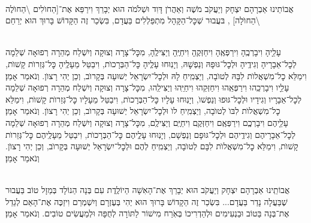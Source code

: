 \documentclass[twoside, openany, parskip=half, 11pt]{book}
\begin{document}
\begin{small}

\\
אֲבוֹתֵינוּ אַבְרָהָם יִצְחָק וְיַעֲקֹב מֹשֶׁה וְאַהֲרֹן דָּוִד וּשְׁלֹמֹה הוּא יְבָרֵךְ וִירַפֵּא אֶת־[הַחוׂלִים \textbackslash הַחוׂלֶה \textbackslash הַחוׂלָה]
,
בּעֲבוּר שְׁכׇּל־הַקָּהָל מִתְפַּלְלִים בַּעֲדָם, בִּשְׂכַר זֶה
הַקָּדוֹשׁ בָּרוּךְ הוּא יְרַחֵם
\setcolumnwidth{1.4in,1.4in,1.4in}
\begin{paracol}{3}
\\
עָלֵָיהָ וִיבָרְכֶֽהָ וִירַפְּאֶֽהָ וִיחַזְּקֶֽהָ וִיחַיֶּֽהָ וְיַצִּילֶֽהָ, מִכׇּל־צָרָה וְצוּקָה וְיִשְׁלַח מְהֵרָה רְפוּאָה שְׁלֵמָה לְכׇל־אֵבָרָיהָ וְגִידֶֽיהָ וּלְכׇל־גּוּפָהּ וְנַפְשׇׁהּ, וְיָנֽוּחוּ עָלְֶיהָ כׇּל־הַבְּרָכוׂת, וִיבַטֵּל מֵעָלֶֽיהָ כׇּל־גְּזֵרוׂת קָשׁוׂת, וִימַלֵּא כׇל־מִשְׁאֲלוׂת לִבָּהּ לְטוׂבָה, וְיַצְמִֽיחַ לָהּ וּלְכׇל־יִשְׂרָאֵל יְשׁוּעָה בְּקָרוׂב, וְכֵן יְהִי רָצוׂן. וְנֹאמַר אָמֵן׃
\switchcolumn
{}\\
עָלֵָיו וִיבָרְכֵֽהוּ וִירַפְּאֵֽהוּ וִיחַזְּקֵהוּ וִיחַיֵּֽהוּ וְיַצִּילֵֽהוּ, מִכׇּל־צָרָה וְצוּקָה וְיִשְׁלַח מְהֵרָה רְפוּאָה שְׁלֵמָה לְכׇל־אֵבָרָיו וְגִידָיו וּלְכׇל־גּוּפוּ וְנַפְשׁוׂ, וְיָנֽוּחוּ עָלָיו כׇּל־הַבְּרָכוׂת, וִיבַטֵּל מֵעָלָיו כׇּל־גְּזֵרוׂת קָשׁוׂת, וִימַלֵּא כׇל־מִשְׁאֲלוׂת לִבּוׂ לְטוׂבָה, וְיַצְמִֽיחַ לוׂ וּלְכׇל־יִשְׂרָאֵל יְשׁוּעָה בְּקָרוׂב, וְכֵן יְהִי רָצוׂן. וְנֹאמַר אָמֵן׃
\switchcolumn
{}\\
עָלֵָיהֶם וִיבָרְכְֶם וִירַפְּאֶֽם וִיחַזְּקֶֽם וִיחַיֶּֽם וְיַצִּילֶֽם, מִכׇּל־צָרָה וְצוּקָה וְיִשְׁלַח מְהֵרָה רְפוּאָה שְׁלֵמָה לְכׇל־אֵבָרָיהֶם וְגִידֶֽיהֶם וּלְכׇל־גּוּפָם וְנַפְשָׁם, וְיָנֽוּחוּ עָלְֶיהֶם כׇּל־הַבְּרָכוׂת, וִיבַטֵּל מֵעָלֶֽיהֶם כׇּל־גְּזֵרוׂת קָשׁוׂת, וִימַלֵּא כׇל־מִשְׁאֲלוׂת לִבָּם לְטוׂבָה, וְיַצְמִֽיחַ לְהֶם וּלְכׇל־יִשְׂרָאֵל יְשׁוּעָה בְּקָרוׂב, וְכֵן יְהִי רָצוׂן. וְנֹאמַר אָמֵן׃
\end{paracol}

\vspace{\baselineskip}

\\
אֲבוֹתֵֽינוּ אַבְרָהָם יִצְחָק וְיַעֲקֹב הוּא יְבָרֵךְ אֶת־הָאִשָׁה הַיוֹלֶֽדֶת
עִם בְּנָה הַנוֹלָד בְּמַזָל טוֹב בַּעֲבוּר שֶׁבַּעֲלָה נָדַר בַּעֲדָם... בִּשְׂכַר זֶה הַקָדוֹשׁ בָּרוּךְ הוּא יְהִי בְּעֶזְרָם וְיִשְׁמְרֵם וִיזַכֶּה אֶת־הָאֵם לְגַדֵל אֶת־בְּנָה בַּטוֹב וּבַנְעִימִים וּלְהַדְרִיכוֹ בְּאֹֽרַח מִישׁוֹר לַתּוֹרָה לְחֻפָּה וּלְמַעֲשִׂים טוֹבִים. וְנֹאמַר אָמֵן׃


\end{small}
\end{document}
